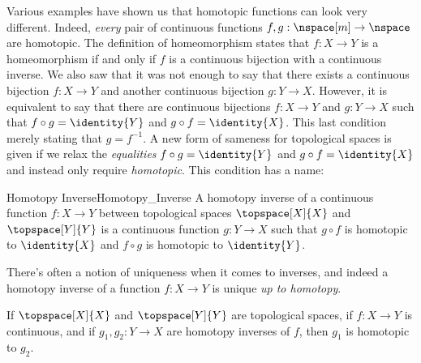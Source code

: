 \documentclass[oneside]{book}                                                  %
\begin{document}
                Various examples have shown us that homotopic functions can look
                very different. Indeed, \textit{every} pair of continuous
                functions $f,g:\nspace[m]\rightarrow\nspace$ are homotopic. The
                definition of homeomorphism states that $f:X\rightarrow{Y}$ is
                a homeomorphism if and only if $f$ is a continuous bijection
                with a continuous inverse. We also saw that it was not enough to
                say that there exists a continuous bijection $f:X\rightarrow{Y}$
                and another continuous bijection $g:Y\rightarrow{X}$. However,
                it is equivalent to say that there are continuous bijections
                $f:X\rightarrow{Y}$ and $g:Y\rightarrow{X}$ such that
                $f\circ{g}=\identity{Y}$ and $g\circ{f}=\identity{X}$. This last
                condition merely stating that $g=f^{\minus{1}}$. A new form of
                sameness for topological spaces is given if we relax the
                \textit{equalities} $f\circ{g}=\identity{Y}$ and
                $g\circ{f}=\identity{X}$ and instead only require
                \textit{homotopic}. This condition has a name:
                \begin{fdefinition}{Homotopy Inverse}{Homotopy_Inverse}
                    A homotopy inverse of a continuous function
                    $f:X\rightarrow{Y}$ between topological spaces
                    $\topspace[X]{X}$ and $\topspace[Y]{Y}$ is a continuous
                    function $g:Y\rightarrow{X}$ such that $g\circ{f}$ is
                    homotopic to $\identity{X}$ and $f\circ{g}$ is homotopic to
                    $\identity{Y}$.
                \end{fdefinition}
                There's often a notion of uniqueness when it comes to inverses,
                and indeed a homotopy inverse of a function $f:X\rightarrow{Y}$
                is unique \textit{up to homotopy}.
                \begin{theorem}
                    If $\topspace[X]{X}$ and $\topspace[Y]{Y}$ are topological
                    spaces, if $f:X\rightarrow{Y}$ is continuous, and if
                    $g_{1},g_{2}:Y\rightarrow{X}$ are homotopy inverses
                    of $f$, then $g_{1}$ is homotopic to ${g}_{2}$.
                \end{theorem}
\end{document}
